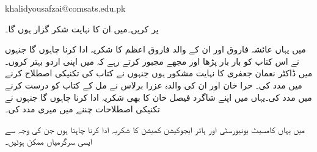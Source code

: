 {
\begin{otherlanguage}{english}
khalidyousafzai@comsats.edu.pk
\end{otherlanguage}
}

 پر کریں۔میں ان کا نہایت شکر گزار ہوں گا۔

میں یہاں عائشہ فاروق اور ان کے والد فاروق اعظم کا شکریہ ادا کرنا چاہوں گا جنہوں نے  اس کتاب کو بار بار پڑھا اور مجھے مجبور کرتے رہے کہ میں اپنی اردو بہتر کروں۔میں ڈاکٹر نعمان جعفری کا نہایت مشکور ہوں جنہوں  نے کتاب کی تکنیکی اصطلاح کرنے میں مدد کی۔ حرا خان اور ان کی والدہ عزرا برلاس نے مل کے کتاب کو درست کرنے میں مدد کی۔یہاں میں اپنے شاگرد فیصل خان کا بھی شکریہ ادا کرنا چاہوں گا جنہوں نے تکنیکی اصطلاحات چننے میں میری مدد کی۔

میں یہاں کامسیٹ یونیورسٹی اور ہائر ایجوکیشن کمیشن کا شکریہ ادا کرنا چاہتا ہوں جن کی وجہ سے ایسی سرگرمیاں ممکن ہوئیں۔	
\vspace{5mm}

{}
